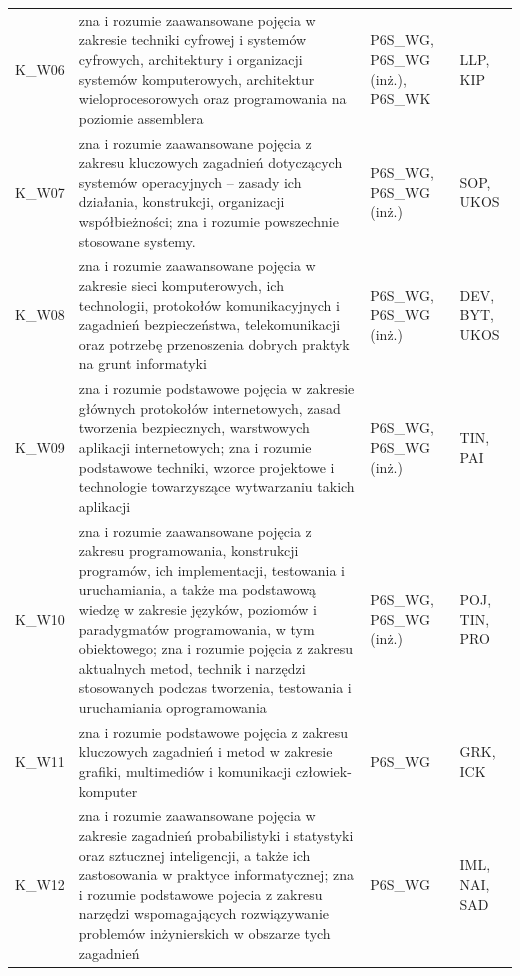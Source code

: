 \documentclass[12pt,a4paper]{article}
\begin{document}
{\begin{longtable}{m{1cm}m{8.8cm}m{2.1cm}m{2.5cm}}
\rowcolor{tableRowAlt} K\_W06 & zna i rozumie zaawansowane pojęcia w zakresie techniki cyfrowej i systemów cyfrowych, architektury i organizacji systemów komputerowych, architektur wieloprocesorowych oraz programowania na poziomie assemblera & {\scriptsize P6S\_WG, P6S\_WG {\scriptsize (inż.)}, P6S\_WK} & {\scriptsize LLP, KIP} \\
\rowcolor{tableRowLight} K\_W07 & zna i rozumie zaawansowane pojęcia z zakresu kluczowych zagadnień dotyczących systemów operacyjnych -- zasady ich działania, konstrukcji, organizacji współbieżności; zna i rozumie powszechnie stosowane systemy. & {\scriptsize P6S\_WG, P6S\_WG {\scriptsize (inż.)}} & {\scriptsize SOP, UKOS} \\
\rowcolor{tableRowAlt} K\_W08 & zna i rozumie zaawansowane pojęcia w zakresie sieci komputerowych, ich technologii, protokołów komunikacyjnych i zagadnień bezpieczeństwa, telekomunikacji oraz potrzebę przenoszenia dobrych praktyk na grunt informatyki & {\scriptsize P6S\_WG, P6S\_WG {\scriptsize (inż.)}} & {\scriptsize DEV, BYT, UKOS} \\
\rowcolor{tableRowLight} K\_W09 & zna i rozumie podstawowe pojęcia w zakresie głównych protokołów internetowych, zasad tworzenia bezpiecznych, warstwowych aplikacji internetowych; zna i rozumie podstawowe techniki, wzorce projektowe i technologie towarzyszące wytwarzaniu takich aplikacji & {\scriptsize P6S\_WG, P6S\_WG {\scriptsize (inż.)}} & {\scriptsize TIN, PAI} \\
\rowcolor{tableRowAlt} K\_W10 & zna i rozumie zaawansowane pojęcia z zakresu programowania, konstrukcji programów, ich implementacji, testowania i uruchamiania, a także ma podstawową wiedzę w zakresie języków, poziomów i paradygmatów programowania, w tym obiektowego; zna i rozumie pojęcia z zakresu aktualnych metod, technik i narzędzi stosowanych podczas tworzenia, testowania i uruchamiania oprogramowania & {\scriptsize P6S\_WG, P6S\_WG {\scriptsize (inż.)}} & {\scriptsize POJ, TIN, PRO} \\
\rowcolor{tableRowLight} K\_W11 & zna i rozumie podstawowe pojęcia z zakresu kluczowych zagadnień i metod w zakresie grafiki, multimediów i komunikacji człowiek-komputer & {\scriptsize P6S\_WG} & {\scriptsize GRK, ICK} \\
\rowcolor{tableRowAlt} K\_W12 & zna i rozumie zaawansowane pojęcia w zakresie zagadnień probabilistyki i statystyki oraz sztucznej inteligencji, a także ich zastosowania w praktyce informatycznej; zna i rozumie podstawowe pojecia z zakresu narzędzi wspomagających rozwiązywanie problemów inżynierskich w obszarze tych zagadnień & {\scriptsize P6S\_WG} & {\scriptsize IML, NAI, SAD} \\

\end{longtable}}
\end{document}
